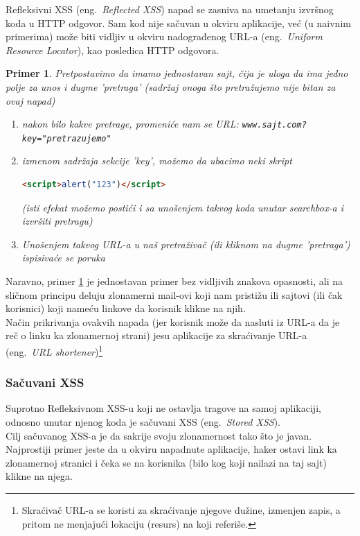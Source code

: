 \documentclass[a4paper]{article}
\newtheorem{primer}{Primer}[section]
\begin{document}
Refleksivni XSS (eng.~{\em Reflected XSS}) napad se zasniva na umetanju izvršnog koda u HTTP odgovor. Sam kod nije sačuvan u okviru aplikacije, već (u naivnim primerima) može biti vidljiv u okviru nadograđenog URL-a (eng.~{\em Uniform Resource Locator}), kao posledica HTTP odgovora.
\begin{primer}
\label{primer1}
Pretpostavimo da imamo jednostavan sajt, čija je uloga da ima jedno polje za unos i dugme 'pretraga' (sadržaj onoga što pretražujemo nije bitan za ovaj napad)
\begin{enumerate}
\item nakon bilo kakve pretrage, promeniće nam se URL: 
\texttt{www.sajt.com?key="pretrazujemo"}
\item izmenom sadržaja sekcije 'key', možemo da ubacimo neki skript

\begin{lstlisting}[language=HTML]
<script>alert("123")</script>
\end{lstlisting}

(isti efekat možemo postići i sa unošenjem takvog koda unutar searchbox-a i izvršiti pretragu)
\item Unošenjem takvog URL-a u naš pretraživač (ili kliknom na dugme 'pretraga') ispisivaće se poruka \\

\end{enumerate}
\end{primer}

 Naravno, primer \ref{primer1} je jednostavan primer bez vidljivih znakova opasnosti, ali na sličnom principu deluju zlonamerni mail-ovi koji nam pristižu ili sajtovi (ili čak korisnici) koji nameću linkove da korisnik klikne na njih.\\
Način prikrivanja ovakvih napada (jer korisnik može da nasluti iz URL-a da je reč o linku ka zlonamernoj strani) jesu aplikacije za skraćivanje URL-a (eng.~{\em URL shortener})\footnote{Skraćivač URL-a se koristi za skraćivanje njegove dužine, izmenjen zapis, a pritom ne menjajući lokaciju (resurs) na koji referiše.}

\subsubsection{Sačuvani XSS}

Suprotno Refleksivnom XSS-u koji ne ostavlja tragove na samoj aplikaciji, odnosno unutar njenog koda je sačuvani XSS (eng.~{\em Stored XSS}).\\ Cilj sačuvanog XSS-a je da sakrije svoju zlonamernost tako što je javan. Najprostiji primer jeste da u okviru napadnute aplikacije, haker ostavi link ka zlonamernoj stranici i čeka se na korisnika (bilo kog koji nailazi na taj sajt) klikne na njega.
\end{document}
